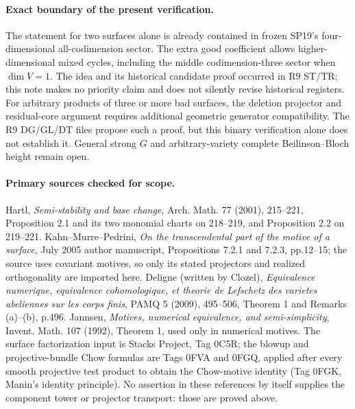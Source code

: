 \paragraph{Exact boundary of the present verification.}
The statement for two surfaces alone is already contained in frozen
SP19's four-dimensional all-codimension sector. The extra good
coefficient allows higher-dimensional mixed cycles, including the
middle codimension-three sector when $\dim V=1$. The idea and its
historical candidate proof occurred in R9 ST/TR; this note makes no
priority claim and does not silently revise historical registers.
For arbitrary products of three or more bad surfaces, the deletion
projector and residual-core argument requires additional geometric
generator compatibility. The R9 DG/GL/DT files propose such a proof,
but this binary verification alone does not establish it. General
strong $G$ and arbitrary-variety complete Beilinson--Bloch height
remain open.

\paragraph{Primary sources checked for scope.}
Hartl, \emph{Semi-stability and base change}, Arch. Math. 77 (2001),
215--221, Proposition 2.1 and its two monomial charts on 218--219,
and Proposition 2.2 on 219--221. Kahn--Murre--Pedrini,
\emph{On the transcendental part of the motive of a surface},
July 2005 author manuscript, Propositions 7.2.1 and 7.2.3,
pp.12--15; the source uses covariant motives, so only its stated
projectors and realized orthogonality are imported here.
Deligne (written by Clozel), \emph{Equivalence numerique,
equivalence cohomologique, et theorie de Lefschetz des varietes
abeliennes sur les corps finis}, PAMQ 5 (2009), 495--506,
Theorem 1 and Remarks (a)--(b), p.496. Jannsen,
\emph{Motives, numerical equivalence, and semi-simplicity},
Invent. Math. 107 (1992), Theorem 1, used only in numerical motives.
The surface factorization input is Stacks Project, Tag 0C5R;
the blowup and projective-bundle Chow formulas are Tags 0FVA and
0FGQ, applied after every smooth projective test product to obtain
the Chow-motive identity (Tag 0FGK, Manin's identity principle).
No assertion in these references by itself supplies the component
tower or projector transport: those are proved above.
